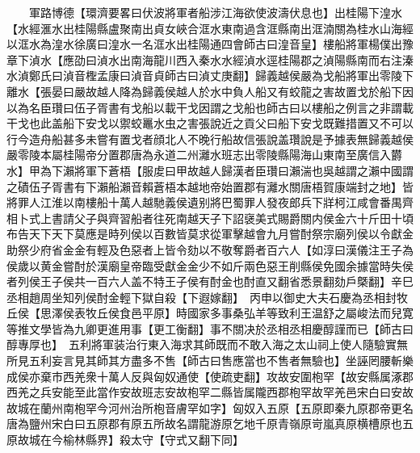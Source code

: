 　　軍路博德【環濟要畧曰伏波將軍者船涉江海欲使波濤伏息也】出桂陽下湟水【水經滙水出桂陽縣盧聚南出貞女峽合洭水東南過含洭縣南出洭湳關為桂水山海經以洭水為湟水徐廣曰湟水一名洭水出桂陽通四會師古曰湟音皇】樓船將軍楊僕出豫章下湞水【應劭曰湞水出南海龍川西入秦水水經湞水逕桂陽郡之湞陽縣南而右注溱水湞鄭氏曰湞音檉孟康曰湞音貞師古曰湞丈庚翻】歸義越侯嚴為戈船將軍出零陵下離水【張晏曰嚴故越人降為歸義侯越人於水中負人船又有蛟龍之害故置戈於船下因以為名臣瓚曰伍子胥書有戈船以載干戈因謂之戈船也師古曰以樓船之例言之非謂載干戈也此盖船下安戈以禦蛟鼉水虫之害張說近之貢父曰船下安戈既難措置又不可以行今造舟船甚多未嘗有置戈者顔北人不晚行船故信張說盖瓚說是予據表無歸義越侯嚴零陵本屬桂陽帝分置郡唐為永道二州灕水班志出零陵縣陽海山東南至廣信入欝水】甲為下瀨將軍下蒼梧【服䖍曰甲故越人歸漢者臣瓚曰瀨湍也吳越謂之瀨中國謂之磧伍子胥書有下瀨船瀨音賴蒼梧本越地帝始置郡有灕水關唐梧賀康端封之地】皆將罪人江淮以南樓船十萬人越馳義侯遺别將巴蜀罪人發夜郎兵下牂柯江咸會番禺齊相卜式上書請父子與齊習船者往死南越天子下詔襃美式賜爵關内侯金六十斤田十頃布告天下天下莫應是時列侯以百數皆莫求從軍擊越會九月嘗酎祭宗廟列侯以令獻金助祭少府省金金有輕及色惡者上皆令劾以不敬奪爵者百六人【如淳曰漢儀注王子為侯歲以黄金嘗酎於漢廟皇帝臨受獻金金少不如斤兩色惡王削縣侯免國余據當時失侯者列侯王子侯共一百六人盖不特王子侯有酎金也酎直又翻省悉景翻劾戶槩翻】辛巳丞相趙周坐知列侯酎金輕下獄自殺【下遐嫁翻】　丙申以御史大夫石慶為丞相封牧丘侯【思澤侯表牧丘侯食邑平原】時國家多事桑弘羊等致利王温舒之屬峻法而兒寛等推文學皆為九卿更進用事【更工衡翻】事不關决於丞相丞相慶醇謹而已【師古曰醇專厚也】　五利將軍装治行東入海求其師既而不敢入海之太山祠上使人隨驗實無所見五利妄言見其師其方盡多不售【師古曰售應當也不售者無驗也】坐誣罔腰斬樂成侯亦棄市西羌衆十萬人反與匈奴通使【使疏吏翻】攻故安圍枹罕【故安縣属涿郡西羌之兵安能至此當作安故班志安故枹罕二縣皆属隴西郡枹罕故罕羌邑宋白曰安故故城在蘭州南枹罕今河州治所枹音膚罕如字】匈奴入五原【五原即秦九原郡帝更名唐為鹽州宋白曰五原郡有原五所故名謂龍游原乞地千原青嶺原岢嵐真原横槽原也五原故城在今榆林縣界】殺太守【守式又翻下同】

